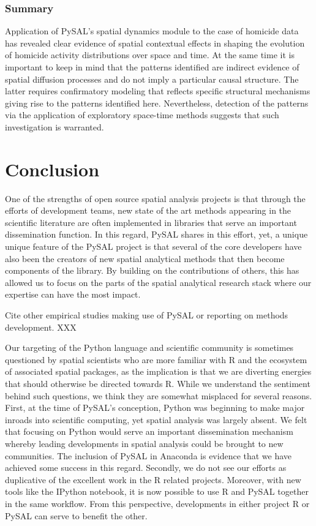 \documentclass[11pt, titlepage]{article}
\begin{document}
\subsubsection{Summary}
Application of PySAL's  spatial dynamics module to the case of homicide data has
revealed clear evidence of spatial contextual effects in shaping the
evolution of homicide activity distributions over space and time. At the
same time it is important to keep in mind that the patterns identified
are indirect evidence of spatial diffusion processes and do not imply a
particular causal structure. The latter requires confirmatory modeling
that reflects specific structural mechanisms giving rise to the patterns
identified here. Nevertheless, detection of the patterns via the
application of exploratory space-time methods suggests that such investigation is
warranted.

\section{Conclusion}

One of the strengths of open source spatial analysis projects is that
through the efforts of development teams, new state of the art methods
appearing in the scientific literature are often implemented in
libraries that serve an important dissemination function. In this
regard, PySAL shares in this effort, yet, a unique unique feature of the
PySAL project is that several of the core developers have also been the
creators of new spatial analytical methods that then become components
of the library. By building on the contributions of others, this has
allowed us to focus on the parts of the spatial analytical research
stack where our expertise can have the most impact.

Cite other empirical studies making use of PySAL or reporting on methods
development. XXX

Our targeting of the Python language and scientific community is
sometimes questioned by spatial scientists who are more familiar with R
and the ecosystem of associated spatial packages, as the implication is
that we are diverting energies that should otherwise be directed towards
R. While we understand the sentiment behind such questions, we think
they are somewhat misplaced for several reasons. First, at the time of
PySAL's conception, Python was beginning to make major inroads into
scientific computing, yet spatial analysis was largely absent. We felt
that focusing on Python would serve an important dissemination mechanism
whereby leading developments in spatial analysis could be brought to new
communities. The inclusion of PySAL in Anaconda is evidence that we have
achieved some success in this regard. Secondly, we do not see our
efforts as duplicative of the excellent work in the R related projects.
Moreover, with new tools like the IPython notebook, it is now possible
to use R and PySAL together in the same workflow. From this perspective,
developments in either project R or PySAL can serve to benefit the
other.
\end{document}
